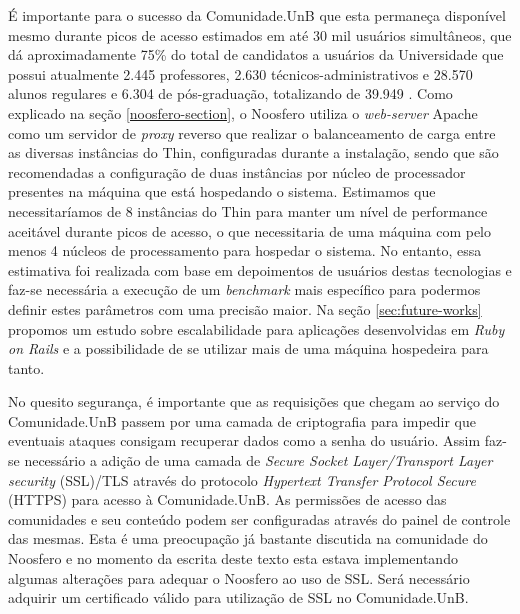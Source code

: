É importante para o sucesso da Comunidade.UnB que esta permaneça disponível
mesmo durante picos de acesso estimados em até 30 mil usuários simultâneos,
que dá aproximadamente 75\% do total de candidatos a usuários da Universidade
que possui atualmente 2.445 professores, 2.630 técnicos-administrativos
e 28.570 alunos regulares e 6.304 de pós-graduação, totalizando de 39.949
\cite{unbInstituicao}. Como explicado na seção \ref{noosfero-section}, o Noosfero
utiliza o \textit{web-server} Apache como um servidor de \textit{proxy} reverso
que realizar o balanceamento de carga entre as diversas instâncias do Thin,
configuradas durante a instalação, sendo que são recomendadas a configuração de
duas instâncias por núcleo de processador presentes na máquina que está
hospedando o sistema.
%
Estimamos que necessitaríamos de 8 instâncias do Thin
para manter um nível de performance aceitável durante picos de acesso, o que
necessitaria de uma máquina com pelo menos 4 núcleos de processamento para
hospedar o sistema. No entanto, essa estimativa foi realizada com base em
depoimentos de usuários destas tecnologias e faz-se necessária a execução de
um \textit{benchmark} mais específico para podermos definir estes parâmetros com
uma precisão maior.
%
Na seção \ref{sec:future-works} propomos um estudo sobre escalabilidade para
aplicações desenvolvidas em \textit{Ruby on Rails} e a possibilidade de se
utilizar mais de uma máquina hospedeira para tanto.

No quesito segurança, é importante que as requisições que chegam ao serviço
do Comunidade.UnB passem por uma camada de criptografia para impedir que
eventuais ataques consigam recuperar dados como a senha do usuário. Assim faz-se
necessário a adição de uma camada de \textit{Secure Socket Layer/Transport
Layer security} (SSL)/TLS através do protocolo \textit{Hypertext Transfer
Protocol Secure} (HTTPS) para acesso à Comunidade.UnB. As permissões de acesso das
comunidades e seu conteúdo podem ser configuradas através do painel de controle
das mesmas. Esta é uma preocupação já bastante discutida na comunidade do
Noosfero e no momento da escrita deste texto esta estava implementando algumas
alterações para adequar o Noosfero ao uso de SSL. Será necessário adquirir um
certificado válido para utilização de SSL no Comunidade.UnB.


